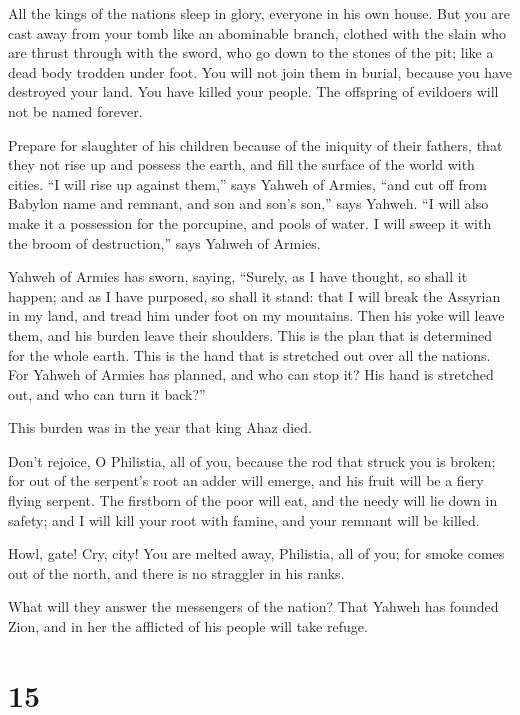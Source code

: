  All the kings of the nations sleep in glory, everyone in
his own house.  But you are cast away from your tomb like
an abominable branch, clothed with the slain who are thrust through with
the sword, who go down to the stones of the pit; like a dead body
trodden under foot.  You will not join them in burial,
because you have destroyed your land. You have killed your people. The
offspring of evildoers will not be named forever.

 Prepare for slaughter of his children because of the
iniquity of their fathers, that they not rise up and possess the earth,
and fill the surface of the world with cities.  ``I will
rise up against them,'' says Yahweh of Armies, ``and cut off from
Babylon name and remnant, and son and son's son,'' says Yahweh.
 ``I will also make it a possession for the porcupine,
and pools of water. I will sweep it with the broom of destruction,''
says Yahweh of Armies.

 Yahweh of Armies has sworn, saying, ``Surely, as I have
thought, so shall it happen; and as I have purposed, so shall it stand:
 that I will break the Assyrian in my land, and tread him
under foot on my mountains. Then his yoke will leave them, and his
burden leave their shoulders.  This is the plan that is
determined for the whole earth. This is the hand that is stretched out
over all the nations.  For Yahweh of Armies has planned,
and who can stop it? His hand is stretched out, and who can turn it
back?''

 This burden was in the year that king Ahaz died.

 Don't rejoice, O Philistia, all of you, because the rod
that struck you is broken; for out of the serpent's root an adder will
emerge, and his fruit will be a fiery flying serpent. 
The firstborn of the poor will eat, and the needy will lie down in
safety; and I will kill your root with famine, and your remnant will be
killed.

 Howl, gate! Cry, city! You are melted away, Philistia,
all of you; for smoke comes out of the north, and there is no straggler
in his ranks.

 What will they answer the messengers of the nation? That
Yahweh has founded Zion, and in her the afflicted of his people will
take refuge.

\hypertarget{section-14}{%
\section{15}\label{section-14}}


